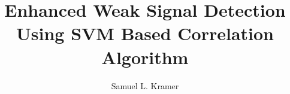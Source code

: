 \documentclass[doublespace ,nopageskip]{VTthesis}
\title{Enhanced Weak Signal Detection Using SVM Based Correlation Algorithm}
\author{Samuel L. Kramer}
\begin{document}
    \frontmatter
    \maketitle
    \tableofcontents
    \listoffigures
    \printnomenclature


\mainmatter













\printbibliography
\end{document}
